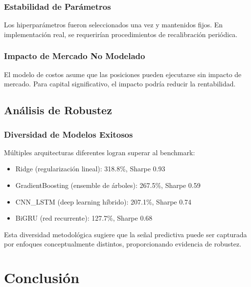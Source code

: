 \documentclass[11pt,a4paper]{article}
\begin{document}
\subsubsection{Estabilidad de Par\'ametros}

Los hiperpar\'ametros fueron seleccionados una vez y mantenidos fijos. En implementaci\'on real, se requerir\'ian procedimientos de recalibraci\'on peri\'odica.

\subsubsection{Impacto de Mercado No Modelado}

El modelo de costos asume que las posiciones pueden ejecutarse sin impacto de mercado. Para capital significativo, el impacto podr\'ia reducir la rentabilidad.

\subsection{An\'alisis de Robustez}

\subsubsection{Diversidad de Modelos Exitosos}

M\'ultiples arquitecturas diferentes logran superar al benchmark:
\begin{itemize}[noitemsep]
    \item Ridge (regularizaci\'on lineal): 318.8\%, Sharpe 0.93
    \item GradientBoosting (ensemble de \'arboles): 267.5\%, Sharpe 0.59
    \item CNN\_LSTM (deep learning h\'ibrido): 207.1\%, Sharpe 0.74
    \item BiGRU (red recurrente): 127.7\%, Sharpe 0.68
\end{itemize}

Esta diversidad metodol\'ogica sugiere que la se\~nal predictiva puede ser capturada por enfoques conceptualmente distintos, proporcionando evidencia de robustez.

\section{Conclusi\'on}
\end{document}
